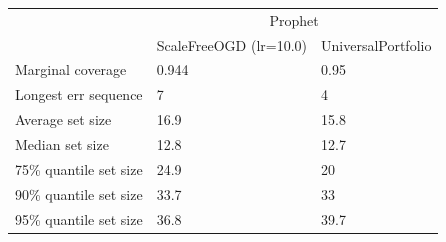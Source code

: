 \begin{tabular}{lll}
\toprule
& \multicolumn{2}{c}{Prophet} \\
& ScaleFreeOGD (lr=10.0) & UniversalPortfolio \\
\midrule
Marginal coverage & 0.944 & 0.95 \\
Longest err sequence & 7 & 4 \\
Average set size & 16.9 & 15.8 \\
Median set size & 12.8 & 12.7 \\
75\% quantile set size & 24.9 & 20 \\
90\% quantile set size & 33.7 & 33 \\
95\% quantile set size & 36.8 & 39.7 \\
\bottomrule
\end{tabular}
